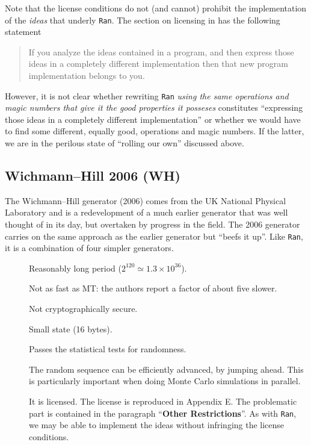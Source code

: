 \documentclass[letterpaper,12pt]{article}
\begin{document}
\begin{description}
  Note that the license conditions do not (and cannot) prohibit the
  implementation of the {\em ideas} that underly \texttt{Ran}. The section
  on licensing in \cite{PressEtAl:numericalRecipes} has the following
  statement
  \begin{quote}
    If you analyze the ideas contained in a program, and then express those
    ideas in a completely different implementation then that new program
    implementation belongs to you.
  \end{quote}
  However, it is not clear whether rewriting \texttt{Ran} {\em using the
    same operations and magic numbers that give it the good properties it posseses}
  constitutes ``expressing those ideas in a completely different
  implementation'' or whether we would have to find some different, equally
  good, operations and magic numbers. If the latter, we are in the perilous state of
  ``rolling our own'' discussed above.

\end{description}

\subsection{Wichmann--Hill 2006 (WH)}
The Wichmann--Hill generator (2006)\cite{WichmannHill:2006} comes from the
UK National Physical Laboratory and is a redevelopment of a much earlier
generator\cite{WichmannHill:1982} that was well thought of in its day, but
overtaken by progress in the field. The 2006 generator carries on the same
approach as the earlier generator but ``beefs it up''. Like \texttt{Ran},
it is a combination of four simpler generators.
\begin{description}
\item[\GoodThing]
  Reasonably long period ($2^{120} \simeq 1.3 \times 10^{36}$).
\item[\PossiblyBadThing]
  Not as fast as MT: the authors report a factor of about five slower.
\item[\PossiblyBadThing]
  Not cryptographically secure.
\item[\GoodThing]
  Small state (16 bytes).
\item[\GoodThing]
  Passes the statistical tests for randomness.
\item[\GoodThing]
  The random sequence can be efficiently advanced, by jumping ahead. This is
  particularly important when doing Monte Carlo simulations in parallel.  
\item[\BadThing]
  It is licensed. The license is reproduced in Appendix E. The problematic
  part is contained in the paragraph ``{\bf\small Other Restrictions}''. As with
  \texttt{Ran}, we may be able to implement the ideas without infringing
  the license conditions.
\end{description}
\end{document}
